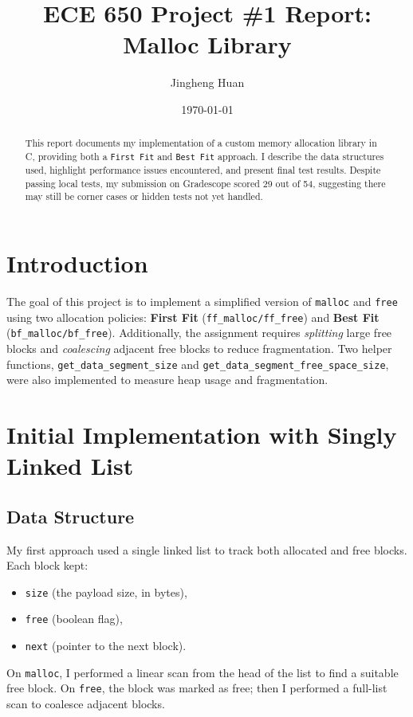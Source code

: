 \documentclass[11pt]{article}
\begin{document}
\title{\textbf{ECE 650 Project \#1 Report: Malloc Library}}
\author{Jingheng Huan}
\date{\today}
\maketitle

\begin{abstract}
This report documents my implementation of a custom memory allocation library in C, providing both a \texttt{First Fit} and \texttt{Best Fit} approach. I describe the data structures used, highlight performance issues encountered, and present final test results. Despite passing local tests, my submission on Gradescope scored 29 out of 54, suggesting there may still be corner cases or hidden tests not yet handled.
\end{abstract}

\section{Introduction}
The goal of this project is to implement a simplified version of \texttt{malloc} and \texttt{free} using two allocation policies: \textbf{First Fit} (\texttt{ff\_malloc/ff\_free}) and \textbf{Best Fit} (\texttt{bf\_malloc/bf\_free}). Additionally, the assignment requires \emph{splitting} large free blocks and \emph{coalescing} adjacent free blocks to reduce fragmentation. Two helper functions, \texttt{get\_data\_segment\_size} and \texttt{get\_data\_segment\_free\_space\_size}, were also implemented to measure heap usage and fragmentation.

\section{Initial Implementation with Singly Linked List}
\subsection{Data Structure}
My first approach used a single linked list to track both allocated and free blocks. Each block kept:
\begin{itemize}
    \item \texttt{size} (the payload size, in bytes),
    \item \texttt{free} (boolean flag),
    \item \texttt{next} (pointer to the next block).
\end{itemize}
On \texttt{malloc}, I performed a linear scan from the head of the list to find a suitable free block. On \texttt{free}, the block was marked as free; then I performed a full-list scan to coalesce adjacent blocks.
\end{document}

